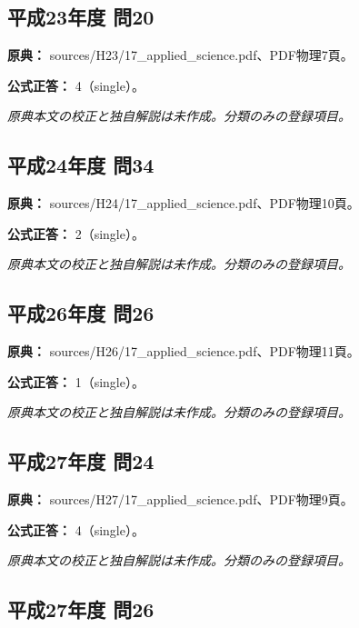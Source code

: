 \subsection{平成23年度 問20}
\label{q:h23-reg-applied-20}

\noindent\textbf{原典：} sources/H23/17\_applied\_science.pdf、PDF物理7頁。

\textbf{公式正答：} 4（single）。

\par\textit{原典本文の校正と独自解説は未作成。分類のみの登録項目。}

\subsection{平成24年度 問34}
\label{q:h24-reg-applied-34}

\noindent\textbf{原典：} sources/H24/17\_applied\_science.pdf、PDF物理10頁。

\textbf{公式正答：} 2（single）。

\par\textit{原典本文の校正と独自解説は未作成。分類のみの登録項目。}

\subsection{平成26年度 問26}
\label{q:h26-reg-applied-26}

\noindent\textbf{原典：} sources/H26/17\_applied\_science.pdf、PDF物理11頁。

\textbf{公式正答：} 1（single）。

\par\textit{原典本文の校正と独自解説は未作成。分類のみの登録項目。}

\subsection{平成27年度 問24}
\label{q:h27-reg-applied-24}

\noindent\textbf{原典：} sources/H27/17\_applied\_science.pdf、PDF物理9頁。

\textbf{公式正答：} 4（single）。

\par\textit{原典本文の校正と独自解説は未作成。分類のみの登録項目。}

\subsection{平成27年度 問26}
\label{q:h27-reg-applied-26}

